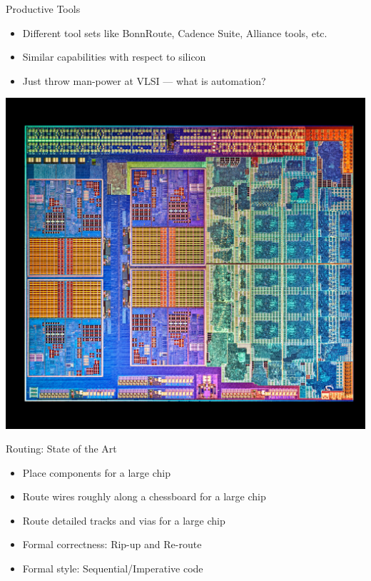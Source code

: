 \documentclass[aspectratio=169]{beamer}
\begin{document}
\begin{frame}{Productive Tools}
	\begin{itemize}
        \setlength\itemsep{1em}
		\item Different tool sets like BonnRoute, Cadence Suite, Alliance tools, etc.
		\item Similar capabilities with respect to silicon
		\item Just throw man-power at VLSI --- what is automation?
	\end{itemize}
\end{frame}

{
\begin{frame}
    \begin{center}
        \includegraphics[height=\textheight]{images/VLSI01_rotated.jpg}
    \end{center}
\end{frame} 
}

\begin{frame}{Routing: State of the Art}
	\begin{itemize}
        \setlength\itemsep{1em}
		\item Place components for a large chip
		\item Route wires roughly along a chessboard for a large chip
		\item Route detailed tracks and vias for a large chip
		\item Formal correctness: Rip-up and Re-route
		\item Formal style: Sequential/Imperative code
	\end{itemize}
\end{frame}
\end{document}
